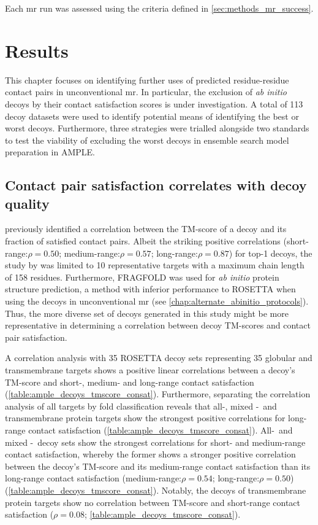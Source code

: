 Each \gls{mr} run was assessed using the criteria defined in \cref{sec:methods_mr_success}.

\section{Results}
This chapter focuses on identifying further uses of predicted residue-residue contact pairs in unconventional \gls{mr}. In particular, the exclusion of \textit{ab initio} decoys by their contact satisfaction scores is under investigation. A total of 113 decoy datasets were used to identify potential means of identifying the best or worst decoys. Furthermore, three strategies were trialled alongside two standards to test the viability of excluding the worst decoys in ensemble search model preparation in AMPLE.

\subsection{Contact pair satisfaction correlates with decoy quality}
\textcite{Kosciolek2014-bt} previously identified a correlation between the TM-score of a decoy and its fraction of satisfied contact pairs. Albeit the striking positive correlations (short-range:$\rho=0.50$; medium-range:$\rho=0.57$; long-range:$\rho=0.87$) for top-1 decoys, the study by \textcite{Kosciolek2014-bt} was limited to 10 representative targets with a maximum chain length of 158 residues. Furthermore, FRAGFOLD \cite{Jones2001-mc} was used for \textit{ab initio} protein structure prediction, a method with inferior performance to ROSETTA \cite{Rohl2004-dj} when using the decoys in unconventional \gls{mr} (see \cref{chap:alternate_abinitio_protocols}). Thus, the more diverse set of decoys generated in this study might be more representative in determining a correlation between decoy TM-scores and contact pair satisfaction.

A correlation analysis with 35 ROSETTA decoy sets representing 35 globular and transmembrane targets shows a positive linear correlations between a decoy's TM-score and short-, medium- and long-range contact satisfaction (\cref{table:ample_decoys_tmscore_consat}). Furthermore, separating the correlation analysis of all targets by fold classification reveals that all-\textalpha, mixed \textalpha-\textbeta\ and transmembrane protein targets show the strongest positive correlations for long-range contact satisfaction (\cref{table:ample_decoys_tmscore_consat}). All-\textbeta\ and mixed \textalpha-\textbeta\ decoy sets show the strongest correlations for short- and medium-range contact satisfaction, whereby the former shows a stronger positive correlation between the decoy's TM-score and its medium-range contact satisfaction than its long-range contact satisfaction (medium-range:$\rho=0.54$; long-range:$\rho=0.50$) (\cref{table:ample_decoys_tmscore_consat}). Notably, the decoys of transmembrane protein targets show no correlation between TM-score and short-range contact satisfaction ($\rho=0.08$; \cref{table:ample_decoys_tmscore_consat}).

